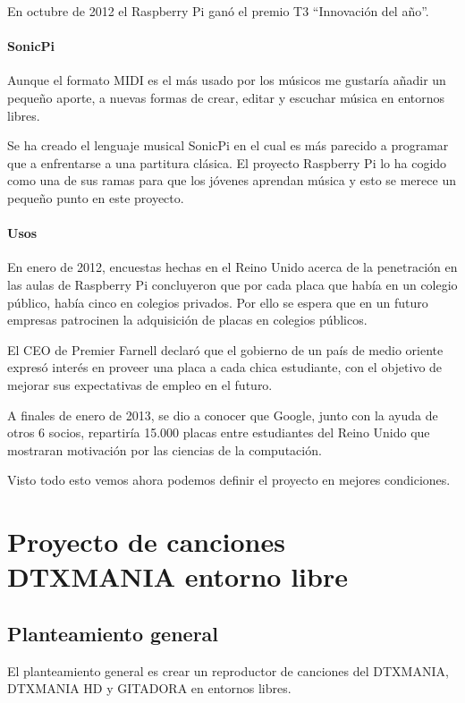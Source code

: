 \documentclass[a4paper,11pt,oneside]{book}
\begin{document}
En octubre de 2012 el Raspberry Pi ganó el premio T3 ``Innovación del año''.

\subsubsection{SonicPi}

Aunque el formato MIDI es el más usado por los músicos me gustaría añadir un pequeño aporte, a nuevas formas de crear, editar y escuchar música en entornos libres.

Se ha creado el lenguaje musical SonicPi en el cual es más parecido a programar que a enfrentarse a una partitura clásica. El proyecto Raspberry Pi lo ha cogido como una de sus ramas para que los jóvenes aprendan música y esto se merece un pequeño punto en este proyecto.


\subsubsection{Usos}

En enero de 2012, encuestas hechas en el Reino Unido acerca de la penetración en las aulas de Raspberry Pi concluyeron que por cada placa que había en un colegio público, había cinco en colegios privados. Por ello se espera que en un futuro empresas patrocinen la adquisición de placas en colegios públicos.

El CEO de Premier Farnell declaró que el gobierno de un país de medio oriente expresó interés en proveer una placa a cada chica estudiante, con el objetivo de mejorar sus expectativas de empleo en el futuro.

A finales de enero de 2013, se dio a conocer que Google, junto con la ayuda de otros 6 socios, repartiría 15.000 placas entre estudiantes del Reino Unido que mostraran motivación por las ciencias de la computación.


Visto todo esto vemos ahora podemos definir el proyecto en mejores condiciones.

\chapter{Proyecto de canciones DTXMANIA entorno libre}
\section{Planteamiento general}
El planteamiento general es crear un reproductor de canciones del DTXMANIA, DTXMANIA HD y GITADORA en entornos libres.
\end{document}
